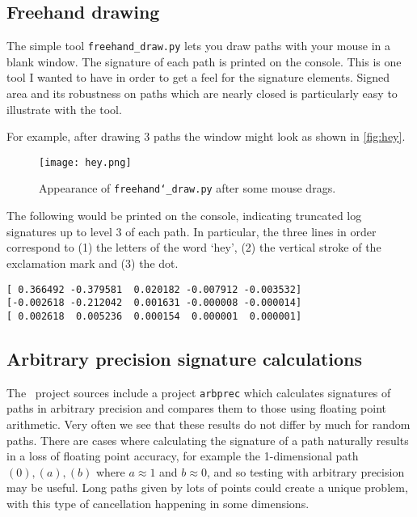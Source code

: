 \subsection{Freehand drawing}
The simple tool \verb|freehand_draw.py| lets you draw paths with your mouse in a blank window. The signature of each path is printed on the console. This is one tool I wanted to have in order to get a feel for the signature elements. Signed area and its robustness on paths which are nearly closed is particularly easy to illustrate with the tool.

For example, after drawing 3 paths the window might look as shown in \autoref{fig:hey}.
\begin{figure}
\begin{center}
	\texttt{[image: hey.png]}
\end{center}
\caption{\label{fig:hey}Appearance of \texttt{freehand\char`_draw.py} after some mouse drags.}
\end{figure}
The following would be printed on the console, indicating truncated log signatures up to level 3 of each path. In particular, the three lines in order correspond to (1) the letters of the word `hey', (2) the vertical stroke of the exclamation mark and (3) the dot.
\begin{lstlisting}
[ 0.366492 -0.379581  0.020182 -0.007912 -0.003532]
[-0.002618 -0.212042  0.001631 -0.000008 -0.000014]
[ 0.002618  0.005236  0.000154  0.000001  0.000001]
\end{lstlisting}

\subsection{Arbitrary precision signature calculations}
The \ii\ project sources include a project \verb|arbprec| which calculates signatures of paths in arbitrary precision and compares them to those using floating point arithmetic. Very often we see that these results do not differ by much for random paths. There are cases where calculating the signature of a path naturally results in a loss of floating point accuracy, for example the 1-dimensional path $(0),(a),(b)$ where $a\approx1$ and $b\approx0$, and so testing with arbitrary precision may be useful.
Long paths given by lots of points could create a unique problem, with this type of cancellation happening in some dimensions.

